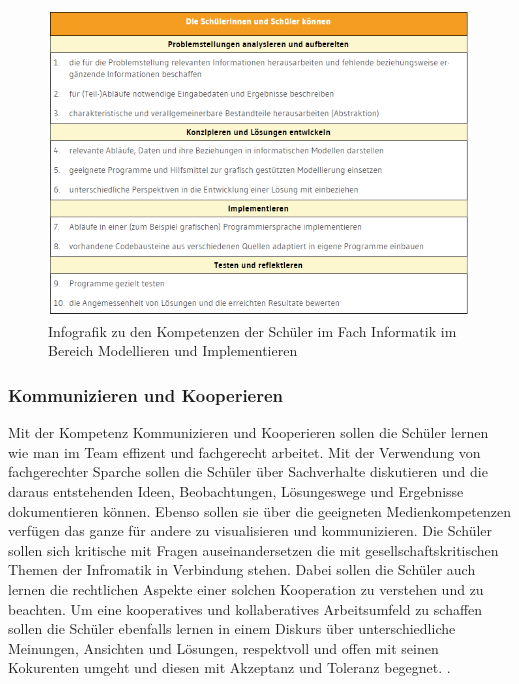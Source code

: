 \begin{figure}[H]
	\centering
	\includegraphics[width=\textwidth,height=\textheight,keepaspectratio]{images/model.png}
	\caption{Infografik zu den Kompetenzen der Schüler im Fach Informatik im Bereich Modellieren und Implementieren}
	\label{Modellieren und Implementieren Infografik}
\end{figure}

\subsubsection{Kommunizieren und Kooperieren}

Mit der Kompetenz Kommunizieren und Kooperieren  sollen die Schüler lernen wie man im Team effizent und fachgerecht arbeitet. Mit der Verwendung von fachgerechter Sparche sollen die Schüler über Sachverhalte diskutieren und die daraus entstehenden Ideen, Beobachtungen, Lösungeswege und Ergebnisse dokumentieren können. Ebenso sollen sie über die geeigneten Medienkompetenzen verfügen das ganze für andere zu visualisieren und kommunizieren. Die Schüler sollen sich kritische mit Fragen auseinandersetzen die mit gesellschaftskritischen Themen der Infromatik in Verbindung stehen. Dabei sollen die Schüler auch lernen die rechtlichen Aspekte einer solchen Kooperation zu verstehen und zu beachten. Um eine kooperatives und kollaberatives Arbeitsumfeld zu schaffen sollen die Schüler ebenfalls lernen in einem Diskurs über unterschiedliche Meinungen, Ansichten und Lösungen, respektvoll und offen mit seinen Kokurenten umgeht und diesen mit Akzeptanz und Toleranz begegnet.
\cite{Model}.

